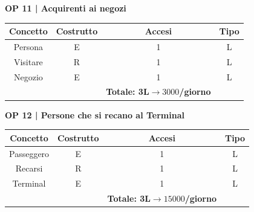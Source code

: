 \textbf{\small OP 11 | Acquirenti ai negozi}\\

\begin{tabular}{ c c c c}
	\hline
	\rowcolor{airforceblue}
	\textbf{\color{white}Concetto} & \textbf{\color{white}Costrutto} & \textbf{\color{white}Accesi} & \textbf{\color{white}Tipo}\\
	\hline
	\textsf{\small Persona} & \textsf{\small E} & \textsf{\small 1} &  \textsf{\small L}\\
	\hline
	\textsf{\small Visitare} & \textsf{\small R} & \textsf{\small 1} &  \textsf{\small L}\\
	\hline
	\textsf{\small Negozio} & \textsf{\small E} & \textsf{\small 1} &  \textsf{\small L}\\
	\hline
	\rowcolor{airforceblue}
	\textsf{\small } & \textsf{\small } & \textbf{\color{white}Totale: 3L$\rightarrow 3000$/giorno } \textsf{\small } & \textsf{\small }\\ %
	\hline
\end{tabular}

\vspace{.6cm}


\textbf{\small OP 12 | Persone che si recano al Terminal}\\

\begin{tabular}{ c c c c}
	\hline
	\rowcolor{airforceblue}
	\textbf{\color{white}Concetto} & \textbf{\color{white}Costrutto} & \textbf{\color{white}Accesi} & \textbf{\color{white}Tipo}\\
	\hline
	\textsf{\small Passeggero} & \textsf{\small E} & \textsf{\small 1} &  \textsf{\small L}\\
	\hline
	\textsf{\small Recarsi} & \textsf{\small R} & \textsf{\small 1} &  \textsf{\small L}\\
	\hline
	\textsf{\small Terminal} & \textsf{\small E} & \textsf{\small 1} &  \textsf{\small L}\\
	\hline
	\hline
	\rowcolor{airforceblue}
	\textsf{\small } & \textsf{\small } & \textbf{\color{white}Totale: 3L$\rightarrow 15000$/giorno } \textsf{\small } & \textsf{\small }\\ %
	\hline
\end{tabular}

